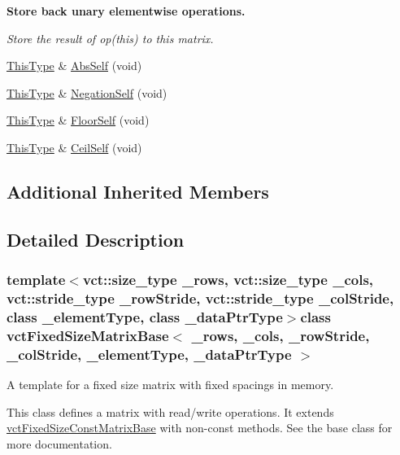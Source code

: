 \begin{Indent}{\bf Store back unary elementwise operations.}\par
{\em Store the result of op(this) to this matrix. }\begin{DoxyCompactItemize}
\item 
\hyperlink{classvct_fixed_size_const_matrix_base_a7ec66a96ed7e08ce9ff54093133c9d8d}{This\-Type} \& \hyperlink{classvct_fixed_size_matrix_base_aa4e74a88ea309570cb7913679b1a9a87}{Abs\-Self} (void)
\item 
\hyperlink{classvct_fixed_size_const_matrix_base_a7ec66a96ed7e08ce9ff54093133c9d8d}{This\-Type} \& \hyperlink{classvct_fixed_size_matrix_base_a5be3db076761851d7882f10365ea4d02}{Negation\-Self} (void)
\item 
\hyperlink{classvct_fixed_size_const_matrix_base_a7ec66a96ed7e08ce9ff54093133c9d8d}{This\-Type} \& \hyperlink{classvct_fixed_size_matrix_base_a633b352b4fa6c4d95c41523a1fe5dd14}{Floor\-Self} (void)
\item 
\hyperlink{classvct_fixed_size_const_matrix_base_a7ec66a96ed7e08ce9ff54093133c9d8d}{This\-Type} \& \hyperlink{classvct_fixed_size_matrix_base_a9233d13ce6ad593e3e1e1a3186b76be1}{Ceil\-Self} (void)
\end{DoxyCompactItemize}
\end{Indent}
\subsection*{Additional Inherited Members}


\subsection{Detailed Description}
\subsubsection*{template$<$vct\-::size\-\_\-type \-\_\-rows, vct\-::size\-\_\-type \-\_\-cols, vct\-::stride\-\_\-type \-\_\-row\-Stride, vct\-::stride\-\_\-type \-\_\-col\-Stride, class \-\_\-element\-Type, class \-\_\-data\-Ptr\-Type$>$class vct\-Fixed\-Size\-Matrix\-Base$<$ \-\_\-rows, \-\_\-cols, \-\_\-row\-Stride, \-\_\-col\-Stride, \-\_\-element\-Type, \-\_\-data\-Ptr\-Type $>$}

A template for a fixed size matrix with fixed spacings in memory. 

This class defines a matrix with read/write operations. It extends \hyperlink{classvct_fixed_size_const_matrix_base}{vct\-Fixed\-Size\-Const\-Matrix\-Base} with non-\/const methods. See the base class for more documentation.

